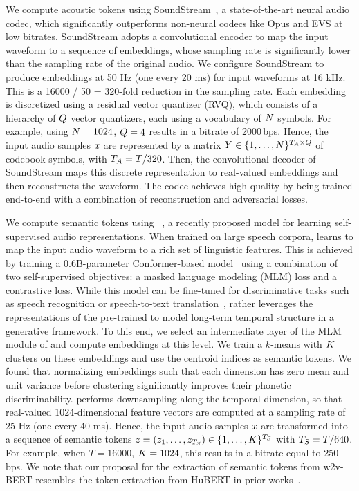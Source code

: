 \documentclass[letterpaper,10 pt]{IEEEtran}
\begin{document}
We compute acoustic tokens using SoundStream~\cite{soundstream}, a state-of-the-art neural audio codec, which significantly outperforms non-neural codecs like Opus and EVS at low bitrates. SoundStream adopts a convolutional encoder to map the input waveform to a sequence of embeddings, whose sampling rate is significantly lower than the sampling rate of the original audio. We configure SoundStream to produce embeddings at 50 Hz (one every 20 ms) for input waveforms at 16 kHz. This is a 16000 / 50 = 320-fold reduction in the sampling rate. Each embedding is discretized using a residual vector quantizer (RVQ), which consists of a hierarchy of $Q$ vector quantizers, each using a vocabulary of $N$ symbols. For example,  using $N = 1024$, $Q=4$ results in a bitrate of 2000\,bps. Hence, the input audio samples $x$ are represented by a matrix $Y \in \{1,\dots,N\}^{{T_A}\times Q}$ of codebook symbols, with ${T_A}=T / 320$. Then, the convolutional decoder of SoundStream maps this discrete representation to real-valued embeddings and then reconstructs the waveform. The codec achieves high quality by being trained end-to-end with a  combination of reconstruction and adversarial losses. 

We compute semantic tokens using \wvbert~\cite{w2vbert}, a recently proposed model for learning self-supervised audio representations. When trained on large speech corpora, \wvbert learns to map the input audio waveform to a rich set of linguistic features. This is achieved by training a 0.6B-parameter Conformer-based model~\cite{conformer} using a combination of two self-supervised objectives: a masked language modeling (MLM) loss and a contrastive loss. While this model can be fine-tuned for discriminative tasks such as speech recognition or speech-to-text translation~\cite{xtremes}, \ours{} rather leverages the representations of the pre-trained \wvbert to model long-term temporal structure in a generative framework. To this end, we select an intermediate layer of the MLM module of \wvbert and compute embeddings at this level. We train a $k$-means with $K$ clusters on these embeddings and use the centroid indices as semantic tokens. We found that normalizing \wvbert embeddings such that each dimension has zero mean and unit variance before clustering significantly improves their phonetic discriminability. \wvbert performs downsampling along the temporal dimension, so that real-valued 1024-dimensional feature vectors are computed at a sampling rate of 25 Hz (one every 40 ms). Hence, the input audio samples $x$ are transformed into a sequence of semantic tokens $z=(z_1,\dots,z_{T_S}) \in \{1,\dots,K\}^{T_S}$ with ${T_S} = T / 640$. For example, when $T=16000$,  $K = 1024$, this results in a bitrate equal to 250\,bps. We note that our proposal for the extraction of semantic tokens from w2v-BERT resembles the token extraction from HuBERT in prior works~\cite{lakhotia2021generative, pgslm}.
\end{document}
